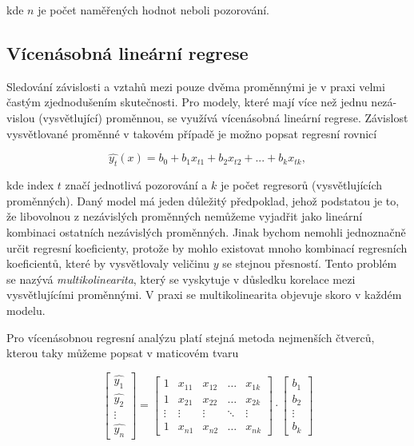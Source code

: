 \documentclass[a4paper,12pt,twoside]{scrreprt}
\begin{document}
kde $n$ je počet naměřených hodnot neboli pozorování. 

\subsection{Vícenásobná lineární regrese}

Sledování závislosti a vztahů mezi pouze dvěma proměnnými je v praxi velmi častým zjednodušením skutečnosti. Pro modely, které mají více než jednu nezá-vislou (vysvětlující) proměnnou, se využívá vícenásobná lineární regrese. Závislost vysvětlované proměnné v takovém případě je možno popsat regresní rovnicí 

\begin{equation}
\hat{y_t}(x) = b_0 + b_1x_{t1} + b_2x_{t2} + ... + b_kx_{tk},
\end{equation}

kde index $t$ značí jednotlivá pozorování a $k$ je počet regresorů (vysvětlujících proměnných). Daný model má jeden důležitý předpoklad, jehož podstatou je to, že libovolnou z nezávislých proměnných nemůžeme vyjadřit jako lineární kombinaci ostatních nezávislých proměnných. Jinak bychom nemohli jednoznačně určit regresní koeficienty, protože by mohlo existovat mnoho kombinací regresních koeficientů, které by vysvětlovaly veličinu $y$ se stejnou přesností. Tento problém se nazývá \textit{multikolinearita}, který se vyskytuje v důsledku korelace mezi vysvětlujícími proměnnými. V praxi se multikolinearita objevuje skoro v každém modelu.

Pro vícenásobnou regresní analýzu platí stejná metoda nejmenších čtverců, kterou taky můžeme popsat v maticovém tvaru 

$$
\begin{bmatrix}
\hat{y_1} \\
\hat{y_2} \\
\vdots \\
\hat{y_n}
\end{bmatrix}
=
\begin{bmatrix}
1 & x_{11} & x_{12} & \ldots & x_{1k} \\
1 & x_{21} & x_{22} & \ldots & x_{2k} \\
\vdots & \vdots & \vdots & \ddots & \vdots \\
1 & x_{n1} & x_{n2} & \ldots & x_{nk}
\end{bmatrix}
\cdot
\begin{bmatrix}
b_1 \\
b_2 \\
\vdots \\
b_k
\end{bmatrix}
$$
\end{document}
